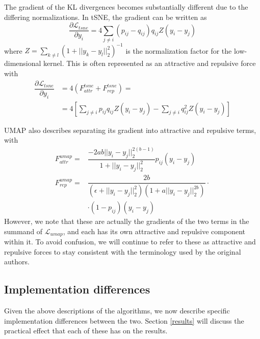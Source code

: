 \documentclass{article}
\theoremstyle{definition}
\begin{document}
\begin{multicols}{2}
The gradient of the KL divergences becomes substantially different due to the differing normalizations. In tSNE, the gradient can be written as
\begin{equation}
    \dfrac{\partial \mathcal{L}_{tsne}}{\partial y_i} = 4 \sum_{j \neq i} (p_{ij} - q_{ij}) q_{ij} Z (y_i - y_j)
\end{equation}
where $Z = \sum_{k \neq l} (1 + ||y_k - y_l||_2^2)^{-1}$ is the normalization factor for the low-dimensional kernel. This is often represented as an attractive
and repulsive force with
\begin{align*}
    \dfrac{\partial \mathcal{L}_{tsne}}{\partial y_i} &= 4(F^{tsne}_{attr} + F^{tsne}_{rep}) = \\
    &= 4 \left[ \sum_{j \neq i} p_{ij}q_{ij}Z (y_i - y_j) - \sum_{j \neq i} q_{ij}^2
Z (y_i - y_j) \right]
\end{align*}

UMAP also describes separating its gradient into attractive and repulsive terms, with
\begin{align}
    F_{attr}^{umap} = &\dfrac{-2ab||y_i - y_j||_2^{2(b-1)}}{1 + ||y_i - y_j||_2^2} p_{ij} (y_i - y_j) \\
    F_{rep}^{umap} = &\dfrac{2b}{(\epsilon + ||y_i - y_j||_2^2)(1 + a ||y_i - y_j||_2^{2b})} \cdot \\
    &\cdot (1 - p_{ij}) (y_i - y_j) \label{umap_rep}
\end{align}
However, we note that these are actually the gradients of the two terms in the summand of $\mathcal{L}_{umap}$, and each has its own attractive and repulsive
component within it. To avoid confusion, we will continue to refer to these as attractive and repulsive forces to stay consistent with the terminology used by
the original authors.

\subsection{Implementation differences} \label{implementation diffs}
Given the above descriptions of the algorithms, we now describe specific implementation differences between the two. Section \ref{results} will discuss the
practical effect that each of these has on the results.


\end{multicols}
\end{document}
